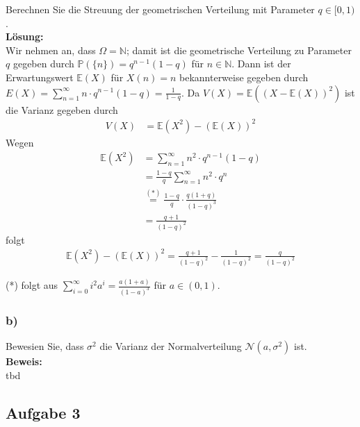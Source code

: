\documentclass[11pt,a4paper,ngerman]{article}
\newcommand{\set}[1]{ \{ #1 \}}
\newcommand{\Prob}{\mathbb{P}}
\begin{document}
Berechnen Sie die Streuung der geometrischen Verteilung mit Parameter $q \in [0,1)$.\\
\textbf{Lösung:}\\
Wir nehmen an, dass $\Omega = \mathbb{N}$; damit ist die geometrische Verteilung zu Parameter $q$ gegeben durch $\Prob(\set{n}) = q^{n-1}(1-q)$ für $n \in \mathbb{N}$.
Dann ist der Erwartungswert $\mathbb{E}(X)$ für $X(n) = n$ bekannterweise gegeben durch $E(X) = \sum_{n=1}^\infty n \cdot q^{n-1}(1-q) = \frac{1}{1-q}$.
Da $V(X) = \mathbb{E}((X - \mathbb{E}(X))^2)$ ist die Varianz gegeben durch
\begin{equation*}\begin{split}
V(X) &=  \mathbb{E}(X^2) -   (\mathbb{E}(X))^2  
\end{split}\end{equation*}
Wegen
\begin{equation*}\begin{split}
\mathbb{E}(X^2) &=  \sum_{n=1}^\infty n^2 \cdot q^{n-1}(1-q) \\
&= \frac{1-q}{q} \sum_{n=1}^\infty n^2 \cdot q^{n}  \\
&\stackrel{(*)}{=}  \frac{1-q}{q} \cdot \frac{q(1+q)}{(1-q)^3}  \\
&= \frac{q+1}{(1-q)^2}
\end{split}\end{equation*}
folgt
\begin{equation*}\begin{split}
\mathbb{E}(X^2) -   (\mathbb{E}(X))^2  = \frac{q+1}{(1-q)^2} -  \frac{1}{(1-q)^2} = \frac{q}{(1-q)^2}
\end{split}\end{equation*}


(*) folgt aus $\sum_{i=0}^\infty i^2 a^i = \frac{a (1+a)}{(1-a)^3}$ für $a \in (0,1)$.


\subsubsection*{b)}

Bewesien Sie, dass $\sigma^2$ die Varianz der Normalverteilung $\mathcal{N}(a,\sigma^2)$ ist.\\

\textbf{Beweis:}\\

tbd

\subsection*{Aufgabe 3}
\end{document}

